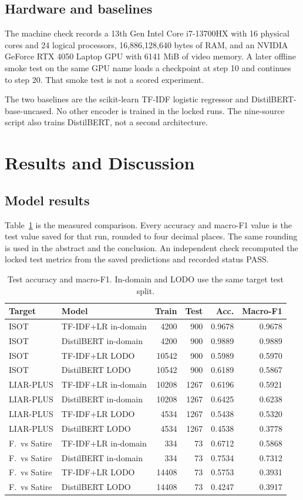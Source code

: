 \documentclass[conference,letterpaper]{IEEEtran}
\begin{document}
\subsection{Hardware and baselines}
The machine check records a 13th Gen Intel Core i7-13700HX with 16 physical cores and 24 logical processors, 16,886,128,640 bytes of RAM, and an NVIDIA GeForce RTX 4050 Laptop GPU with 6141 MiB of video memory. A later offline smoke test on the same GPU name loads a checkpoint at step 10 and continues to step 20. That smoke test is not a scored experiment.

The two baselines are the scikit-learn TF-IDF logistic regressor and DistilBERT-base-uncased. No other encoder is trained in the locked runs. The nine-source script also trains DistilBERT, not a second architecture.

\section{Results and Discussion}
\subsection{Model results}
Table~\ref{tab:main} is the measured comparison. Every accuracy and macro-F1 value is the test value saved for that run, rounded to four decimal places. The same rounding is used in the abstract and the conclusion. An independent check recomputed the locked test metrics from the saved predictions and recorded status PASS.

\begin{table}[t]
\caption{Test accuracy and macro-F1. In-domain and LODO use the same target test split.}
\label{tab:main}
\centering
\scriptsize
\setlength{\tabcolsep}{2.4pt}
\begin{tabular}{llrrrr}
\hline
Target & Model & Train & Test & Acc. & Macro-F1 \\
\hline
ISOT & TF-IDF+LR in-domain & 4200 & 900 & 0.9678 & 0.9678 \\
ISOT & DistilBERT in-domain & 4200 & 900 & 0.9889 & 0.9889 \\
ISOT & TF-IDF+LR LODO & 10542 & 900 & 0.5989 & 0.5970 \\
ISOT & DistilBERT LODO & 10542 & 900 & 0.6189 & 0.5867 \\
LIAR-PLUS & TF-IDF+LR in-domain & 10208 & 1267 & 0.6196 & 0.5921 \\
LIAR-PLUS & DistilBERT in-domain & 10208 & 1267 & 0.6425 & 0.6238 \\
LIAR-PLUS & TF-IDF+LR LODO & 4534 & 1267 & 0.5438 & 0.5320 \\
LIAR-PLUS & DistilBERT LODO & 4534 & 1267 & 0.4538 & 0.3778 \\
F.\ vs Satire & TF-IDF+LR in-domain & 334 & 73 & 0.6712 & 0.5868 \\
F.\ vs Satire & DistilBERT in-domain & 334 & 73 & 0.7534 & 0.7312 \\
F.\ vs Satire & TF-IDF+LR LODO & 14408 & 73 & 0.5753 & 0.3931 \\
F.\ vs Satire & DistilBERT LODO & 14408 & 73 & 0.4247 & 0.3917 \\
\hline
\end{tabular}
\end{table}
\end{document}
